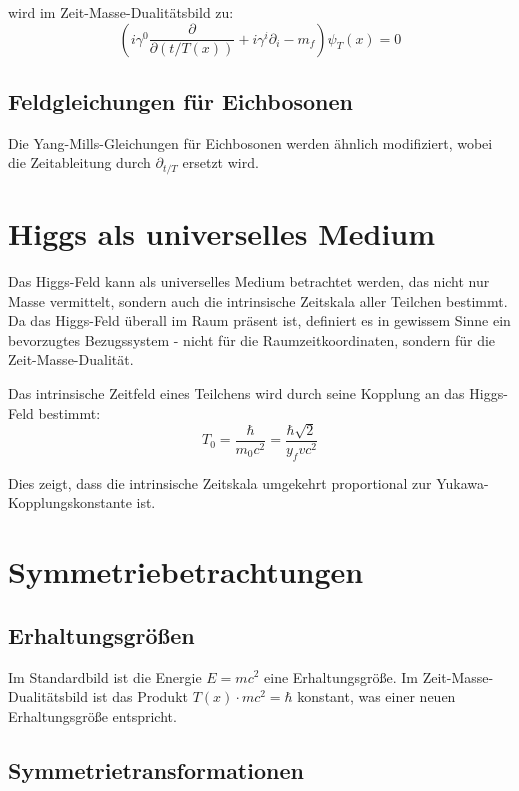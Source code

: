 \documentclass[a4paper,12pt]{article}
\newcommand{\Tfield}{T(x)} %
\begin{document}
	wird im Zeit-Masse-Dualitätsbild zu:
	\begin{equation}
		\left(i\gamma^0\frac{\partial}{\partial(t/\Tfield)} + i\gamma^i\partial_i - m_f\right) \psi_T(x) = 0
	\end{equation}
	
	\subsection{Feldgleichungen für Eichbosonen}
	
	Die Yang-Mills-Gleichungen für Eichbosonen werden ähnlich modifiziert, wobei die Zeitableitung durch $\partial_{t/T}$ ersetzt wird.
	
	\section{Higgs als universelles Medium}
	
	Das Higgs-Feld kann als universelles Medium betrachtet werden, das nicht nur Masse vermittelt, sondern auch die intrinsische Zeitskala aller Teilchen bestimmt. Da das Higgs-Feld überall im Raum präsent ist, definiert es in gewissem Sinne ein bevorzugtes Bezugssystem - nicht für die Raumzeitkoordinaten, sondern für die Zeit-Masse-Dualität.
	
	Das intrinsische Zeitfeld eines Teilchens wird durch seine Kopplung an das Higgs-Feld bestimmt:
	\begin{equation}
		T_0 = \frac{\hbar}{m_0 c^2} = \frac{\hbar \sqrt{2}}{y_f v c^2}
	\end{equation}
	
	Dies zeigt, dass die intrinsische Zeitskala umgekehrt proportional zur Yukawa-Kopplungskonstante ist.
	
	\section{Symmetriebetrachtungen}
	
	\subsection{Erhaltungsgrößen}
	
	Im Standardbild ist die Energie $E = mc^2$ eine Erhaltungsgröße. Im Zeit-Masse-Dualitätsbild ist das Produkt $\Tfield \cdot m c^2 = \hbar$ konstant, was einer neuen Erhaltungsgröße entspricht.
	
	\subsection{Symmetrietransformationen}
	
\end{document}
